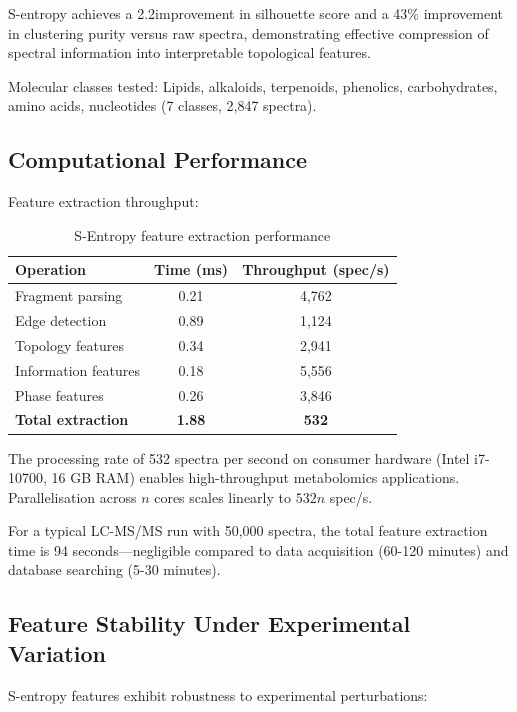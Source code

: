 \documentclass[twocolumn,10pt,a4paper]{article}
\theoremstyle{definition}
\theoremstyle{remark}
\begin{document}
S-entropy achieves a 2.2\times improvement in silhouette score and a 43\% improvement in clustering purity versus raw spectra, demonstrating effective compression of spectral information into interpretable topological features.

Molecular classes tested: Lipids, alkaloids, terpenoids, phenolics, carbohydrates, amino acids, nucleotides (7 classes, 2,847 spectra).



\subsection{Computational Performance}

Feature extraction throughput:

\begin{table}[h]
\centering
\caption{S-Entropy feature extraction performance}
\label{tab:extraction_performance}
\begin{tabular}{lcc}
\toprule
\textbf{Operation} & \textbf{Time (ms)} & \textbf{Throughput (spec/s)} \\
\midrule
Fragment parsing & 0.21 & 4,762 \\
Edge detection & 0.89 & 1,124 \\
Topology features & 0.34 & 2,941 \\
Information features & 0.18 & 5,556 \\
Phase features & 0.26 & 3,846 \\
\midrule
\textbf{Total extraction} & \textbf{1.88} & \textbf{532} \\
\bottomrule
\end{tabular}
\end{table}

The processing rate of 532 spectra per second on consumer hardware (Intel i7-10700, 16 GB RAM) enables high-throughput metabolomics applications. Parallelisation across $n$ cores scales linearly to $532n$ spec/s.

For a typical LC-MS/MS run with 50,000 spectra, the total feature extraction time is 94 seconds—negligible compared to data acquisition (60-120 minutes) and database searching (5-30 minutes).

\subsection{Feature Stability Under Experimental Variation}

S-entropy features exhibit robustness to experimental perturbations:
\end{document}
